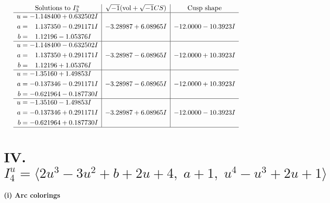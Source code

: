 \documentclass[1p]{elsarticle_modified}
\theoremstyle{definition}
\newcommand{\I}{\sqrt{-1}}
\begin{document}
$$\begin{array}{c|c|c}  
\text{Solutions to }I^u_{3}& \I (\text{vol} + \sqrt{-1}CS) & \text{Cusp shape}\\
 \hline 
\begin{aligned}
u &= -1.148400 + 0.632502 I \\
a &= \phantom{-}1.137350 - 0.291171 I \\
b &= \phantom{-}1.12196 - 1.05376 I\end{aligned}
 & -3.28987 + 6.08965 I & -12.0000 - 10.3923 I \\ \hline\begin{aligned}
u &= -1.148400 - 0.632502 I \\
a &= \phantom{-}1.137350 + 0.291171 I \\
b &= \phantom{-}1.12196 + 1.05376 I\end{aligned}
 & -3.28987 - 6.08965 I & -12.0000 + 10.3923 I \\ \hline\begin{aligned}
u &= -1.35160 + 1.49853 I \\
a &= -0.137346 - 0.291171 I \\
b &= -0.621964 - 0.187730 I\end{aligned}
 & -3.28987 - 6.08965 I & -12.0000 + 10.3923 I \\ \hline\begin{aligned}
u &= -1.35160 - 1.49853 I \\
a &= -0.137346 + 0.291171 I \\
b &= -0.621964 + 0.187730 I\end{aligned}
 & -3.28987 + 6.08965 I & -12.0000 - 10.3923 I\\
 \hline 
 \end{array}$$\newpage\newpage\renewcommand{\arraystretch}{1}
\centering \section*{IV. $I^u_{4}= \langle 2 u^3-3 u^2+b+2 u+4,\;a+1,\;u^4- u^3+2 u+1 \rangle$}
\flushleft \textbf{(i) Arc colorings}\\
\end{document}
